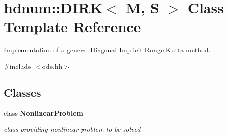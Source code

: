 \hypertarget{classhdnum_1_1DIRK}{
\section{hdnum::DIRK$<$ M, S $>$ Class Template Reference}
\label{classhdnum_1_1DIRK}
}


Implementation of a general Diagonal Implicit Runge-\/Kutta method.  




{\ttfamily \#include $<$ode.hh$>$}

\subsection*{Classes}
\begin{DoxyCompactItemize}
\item 
class {\bfseries NonlinearProblem}
\begin{DoxyCompactList}\small\item\em class providing nonlinear problem to be solved \item\end{DoxyCompactList}\end{DoxyCompactItemize}
